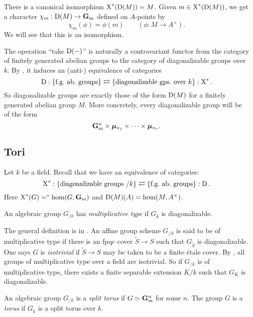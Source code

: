 There is a canonical isomorphism $\operatorname{X}^\ast(\operatorname{D}(M))=M$. Given 
$m\in \operatorname{X}^\ast(\operatorname{D}(M))$, we get a character $\chi_m:\operatorname{D}(M)\to\mathbf{G}_\mathrm{m}$ 
defined on $A$-points by 
\[
  \chi_m(\phi) = \phi(m) \qquad (\phi:M\to A^\times) .
\]
We will see that this is an isomorphism. 

The operation ``take $\operatorname{D}(-)$'' is naturally a contravariant functor from the 
category of finitely generated abelian groups to the category of diagonalizable 
groups over $k$. By \cite[VIII 1.6]{sga3-ii}, it induces an (anti-) equivalence 
of categories 
\[
  \operatorname{D}:\{\text{f.g.~ab.~groups}\} \rightleftarrows \{\text{diagonalizable gps.~over $k$}\}: \operatorname{X}^\ast .
\]
So diagonalizable groups are exactly those of the form 
$\operatorname{D}(M)$ for a finitely generated abelian group $M$. More concretely, every 
diagonalizable group will be of the form 
\[
  \mathbf{G}_\mathrm{m}^n \times \bm{\mu}_{n_1} \times \cdots \times \bm{\mu}_{n_r} .
\]





\subsection{Tori}

Let $k$ be a field. Recall that we have an equivalence of categories: 
\[
  \operatorname{X}^\ast:\{\text{diagonalizable groups }/k\} \rightleftarrows \{\text{f.g.~ab.~groups}\}:\operatorname{D} .
\]
Here $\operatorname{X}^\ast(G)=^\ast\hom(G,\mathbf{G}_\mathrm{m})$ and $\operatorname{D}(M)(A)=\hom(M,A^\times)$. 

\begin{definition}
An algebraic group $G_{/k}$ has \emph{multiplicative type} if $G_{\bar k}$ is 
diagonalizable. 
\end{definition}

\begin{hard}
The general definition is in \cite[IX 1.1]{sga3-iii}. An affine group scheme 
$G_{/S}$ is said to be of multiplicative type if there is an fpqc cover 
$\widetilde S\to S$ such that $G_{\widetilde S}$ is diagonalizable. One says 
$G$ is \emph{isotrivial} if $\widetilde S\to S$ may be taken to be a finite 
\'etale cover. By \cite[X 5.16]{sga3-ii}, all groups of multiplicative type 
over a field are isotrivial. So if $G_{/k}$ is of multiplicative type, there 
exists a finite separable extension $K/k$ such that $G_K$ is diagonalizable. 
\end{hard}

\begin{definition}
An algebraic group $G_{/k}$ is a \emph{split torus} if 
$G\simeq \mathbf{G}_\mathrm{m}^n$ for some $n$. The group $G$ is a \emph{torus} if 
$G_{\bar k}$ is a split torus over $k$. 
\end{definition}

